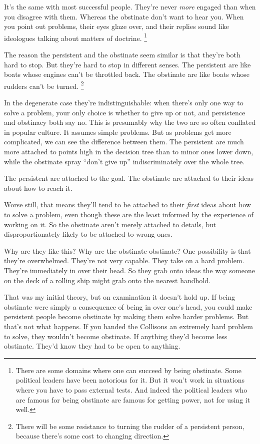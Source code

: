 It's the same with most successful people. They're never \emph{more}
engaged than when you disagree with them. Whereas the obstinate don't
want to hear you. When you point out problems, their eyes glaze over,
and their replies sound like ideologues talking about matters of
doctrine. \footnote{There are some domains where one can succeed by being obstinate.
Some political leaders have been notorious for it. But it won't work in
situations where you have to pass external tests. And indeed the
political leaders who are famous for being obstinate are famous for
getting power, not for using it well.}

The reason the persistent and the obstinate seem similar is that they're
both hard to stop. But they're hard to stop in different senses. The
persistent are like boats whose engines can't be throttled back. The
obstinate are like boats whose rudders can't be turned.
\footnote{There will be some resistance to turning the rudder of a
persistent person, because there's some cost to changing direction.}

In the degenerate case they're indistinguishable: when there's only one
way to solve a problem, your only choice is whether to give up or not,
and persistence and obstinacy both say no. This is presumably why the
two are so often conflated in popular culture. It assumes simple
problems. But as problems get more complicated, we can see the
difference between them. The persistent are much more attached to points
high in the decision tree than to minor ones lower down, while the
obstinate spray ``don't give up'' indiscriminately over the whole tree.

The persistent are attached to the goal. The obstinate are attached to
their ideas about how to reach it.

Worse still, that means they'll tend to be attached to their
\emph{first} ideas about how to solve a problem, even though these are
the least informed by the experience of working on it. So the obstinate
aren't merely attached to details, but disproportionately likely to be
attached to wrong ones.

Why are they like this? Why are the obstinate obstinate? One possibility
is that they're overwhelmed. They're not very capable. They take on a
hard problem. They're immediately in over their head. So they grab onto
ideas the way someone on the deck of a rolling ship might grab onto the
nearest handhold.

That was my initial theory, but on examination it doesn't hold up. If
being obstinate were simply a consequence of being in over one's head,
you could make persistent people become obstinate by making them solve
harder problems. But that's not what happens. If you handed the
Collisons an extremely hard problem to solve, they wouldn't become
obstinate. If anything they'd become less obstinate. They'd know they
had to be open to anything.

